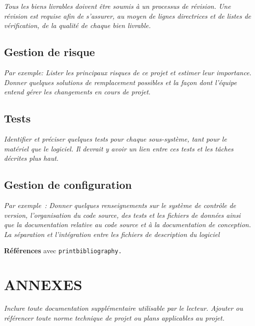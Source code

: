 \documentclass{mistcoursedoc}
\begin{document}
\textit{Tous les biens livrables doivent être soumis à un processus de révision. Une révision est requise afin de s’assurer, au moyen de lignes directrices et de listes de vérification, de la qualité de chaque bien livrable.}

\subsection{Gestion de risque}

\textit{Par exemple: Lister les principaux risques de ce projet et estimer leur importance.  Donner quelques solutions de remplacement possibles et la façon dont l’équipe entend gérer les changements en cours de projet.}

\subsection{Tests}

\textit{Identifier et préciser quelques tests pour chaque sous-système, tant pour le matériel que le logiciel.  Il devrait y avoir un lien entre ces tests et les tâches décrites plus haut.}

\subsection{Gestion de configuration}

\textit{Par exemple : Donner quelques renseignements sur le système de contrôle de version, l’organisation du code source, des tests et les fichiers de données ainsi que la documentation relative au code source et à la documentation de conception.  La séparation et l’intégration entre les fichiers de description du logiciel}

\textbf{Références} avec \texttt{printbibliography.}


\section*{ANNEXES}

\textit{Inclure toute documentation supplémentaire utilisable par le lecteur. Ajouter ou référencer toute norme technique de projet ou plans applicables au projet.}
\end{document}

